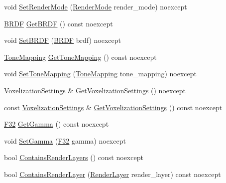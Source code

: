 \begin{DoxyCompactItemize}
void \hyperlink{classmage_1_1rendering_1_1_camera_settings_aa4f29b081141c0acfb0e4d92eac81602}{Set\+Render\+Mode} (\hyperlink{namespacemage_1_1rendering_aeb14ce7610cc9391f4e01be027b91dcc}{Render\+Mode} render\+\_\+mode) noexcept
\item 
\hyperlink{namespacemage_1_1rendering_ab8fe8684ca4bd74ba3a394b00cf125b5}{B\+R\+DF} \hyperlink{classmage_1_1rendering_1_1_camera_settings_a3cb398b3bd69ae3a81e2e4c415d9e195}{Get\+B\+R\+DF} () const noexcept
\item 
void \hyperlink{classmage_1_1rendering_1_1_camera_settings_af2af3e55e876b0e2b037904e221f0bc4}{Set\+B\+R\+DF} (\hyperlink{namespacemage_1_1rendering_ab8fe8684ca4bd74ba3a394b00cf125b5}{B\+R\+DF} brdf) noexcept
\item 
\hyperlink{namespacemage_1_1rendering_a789e4b7d9a8cc831b065e9c6bb7430e9}{Tone\+Mapping} \hyperlink{classmage_1_1rendering_1_1_camera_settings_ae127ec7aa6c836b747d947200f847254}{Get\+Tone\+Mapping} () const noexcept
\item 
void \hyperlink{classmage_1_1rendering_1_1_camera_settings_ab5dc52d8f8d92cf3c4f6aca126f6dc47}{Set\+Tone\+Mapping} (\hyperlink{namespacemage_1_1rendering_a789e4b7d9a8cc831b065e9c6bb7430e9}{Tone\+Mapping} tone\+\_\+mapping) noexcept
\item 
\hyperlink{classmage_1_1rendering_1_1_voxelization_settings}{Voxelization\+Settings} \& \hyperlink{classmage_1_1rendering_1_1_camera_settings_ae30e0070a7376d99a9e3db5c24e45341}{Get\+Voxelization\+Settings} () noexcept
\item 
const \hyperlink{classmage_1_1rendering_1_1_voxelization_settings}{Voxelization\+Settings} \& \hyperlink{classmage_1_1rendering_1_1_camera_settings_a2e3906063aa11044dc325affee24aeb1}{Get\+Voxelization\+Settings} () const noexcept
\item 
\hyperlink{namespacemage_aa97e833b45f06d60a0a9c4fc22ae02c0}{F32} \hyperlink{classmage_1_1rendering_1_1_camera_settings_ae99d9db32dcf8be886e324b647d90ade}{Get\+Gamma} () const noexcept
\item 
void \hyperlink{classmage_1_1rendering_1_1_camera_settings_aff3d5727eaff77fd9f8bb30d352ff7d7}{Set\+Gamma} (\hyperlink{namespacemage_aa97e833b45f06d60a0a9c4fc22ae02c0}{F32} gamma) noexcept
\item 
bool \hyperlink{classmage_1_1rendering_1_1_camera_settings_aa6a33e3b5936e440af32d2ca3d65585f}{Contains\+Render\+Layers} () const noexcept
\item 
bool \hyperlink{classmage_1_1rendering_1_1_camera_settings_aab59f8b20a5d05fd23fff006ef741dac}{Contains\+Render\+Layer} (\hyperlink{namespacemage_1_1rendering_a466c2a441ea5b26e4625c2f34e021b3d}{Render\+Layer} render\+\_\+layer) const noexcept

\end{DoxyCompactItemize}
